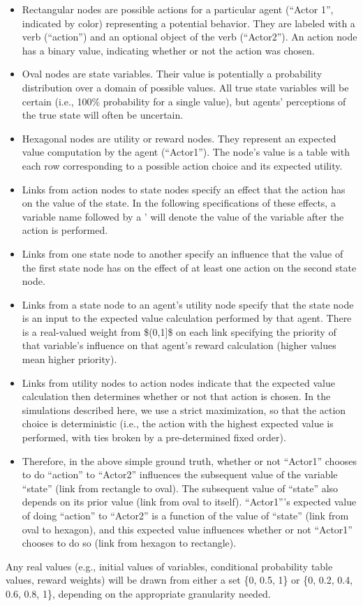 \documentclass{article}%
\begin{document}
%
\begin{itemize}%
\item%
Rectangular nodes are possible actions for a particular agent (``Actor 1'', indicated by color) representing a potential behavior. They are labeled with a verb (``action'') and an optional object of the verb (``Actor2''). An action node has a binary value, indicating whether or not the action was chosen.%
\item%
Oval nodes are state variables. Their value is potentially a probability distribution over a domain of possible values. All true state variables will be certain (i.e., 100\% probability for a single value), but agents' perceptions of the true state will often be uncertain.%
\item%
Hexagonal nodes are utility or reward nodes. They represent an expected value computation by the agent (``Actor1''). The node's value is a table with each row corresponding to a possible action choice and its expected utility.%
\item%
Links from action nodes to state nodes specify an effect that the action has on the value of the state. In the following specifications of these effects, a variable name followed by a ' will denote the value of the variable after the action is performed.%
\item%
Links from one state node to another specify an influence that the value of the first state node has on the effect of at least one action on the second state node.%
\item%
Links from a state node to an agent's utility node specify that the state node is an input to the expected value calculation performed by that agent. There is a real{-}valued weight from \$(0,1{]}\$ on each link specifying the priority of that variable's influence on that agent's reward calculation (higher values mean higher priority).%
\item%
Links from utility nodes to action nodes indicate that the expected value calculation then determines whether or not that action is chosen. In the simulations described here, we use a strict maximization, so that the action choice is deterministic (i.e., the action with the highest expected value is performed, with ties broken by a pre{-}determined fixed order).%
\item%
Therefore, in the above simple ground truth, whether or not ``Actor1'' chooses to do ``action'' to ``Actor2'' influences the subsequent value of the variable ``state'' (link from rectangle to oval). The subsequent value of ``state'' also depends on its prior value (link from oval to itself). ``Actor1'''s expected value of doing ``action'' to ``Actor2'' is a function of the value of ``state'' (link from oval to hexagon), and this expected value influences whether or not ``Actor1'' chooses to do so (link from hexagon to rectangle).%
\end{itemize}%
Any real values (e.g., initial values of variables, conditional probability table values, reward weights) will be drawn from either a set \{0, 0.5, 1\} or \{0, 0.2, 0.4, 0.6, 0.8, 1\}, depending on the appropriate granularity needed.
\end{document}
